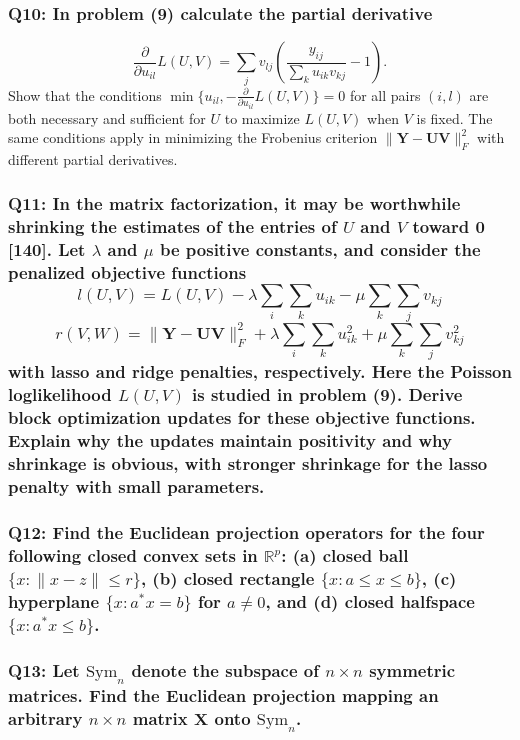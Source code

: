 \documentclass{article}
\begin{document}
\subsubsection*{Q10: In problem (9) calculate the partial derivative}
\[
\frac{\partial}{\partial u_{il}} L(U, V) = \sum_j v_{lj} \left( \frac{y_{ij}}{\sum_k u_{ik}v_{kj}} - 1 \right).
\]
\noindent Show that the conditions \(\min\{u_{il}, - \frac{\partial}{\partial u_{il}} L(U, V)\} = 0\) for all pairs \((i, l)\) are both necessary and sufficient for \(U\) to maximize \(L(U, V)\) when \(V\) is fixed. The same conditions apply in minimizing the Frobenius criterion \(\|\mathbf{Y} - \mathbf{U} \mathbf{V}\|_F^2\) with different partial derivatives.

\subsubsection*{Q11: In the matrix factorization, it may be worthwhile shrinking the estimates of the entries of \(U\) and \(V\) toward 0 [140]. Let \(\lambda\) and \(\mu\) be positive constants, and consider the penalized objective functions
\[
l(U, V) = L(U, V) - \lambda \sum_i \sum_k u_{ik} - \mu \sum_k \sum_j v_{kj}
\]
\[
r(V, W) = \|\mathbf{Y} - \mathbf{UV}\|_F^2 + \lambda \sum_i \sum_k u_{ik}^2 + \mu \sum_k \sum_j v_{kj}^2
\]
\noindent with lasso and ridge penalties, respectively. Here the Poisson loglikelihood \(L(U, V)\) is studied in problem (9). Derive block optimization updates for these objective functions. Explain why the updates maintain positivity and why shrinkage is obvious, with stronger shrinkage for the lasso penalty with small parameters.}

\subsubsection*{Q12: Find the Euclidean projection operators for the four following closed convex sets in \(\mathbb{R}^p\): (a) closed ball \(\{x : \|x - z\| \leq r\}\), (b) closed rectangle \(\{x : a \leq x \leq b\}\), (c) hyperplane \(\{x : a^* x = b\}\) for \(a \neq 0\), and (d) closed halfspace \(\{x : a^* x \leq b\}\).}

\subsubsection*{Q13: Let \(\mathrm{Sym}_n\) denote the subspace of \(n \times n\) symmetric matrices. Find the Euclidean projection mapping an arbitrary \(n \times n\) matrix \(\mathbf{X}\) onto \(\mathrm{Sym}_n\).}
\end{document}
